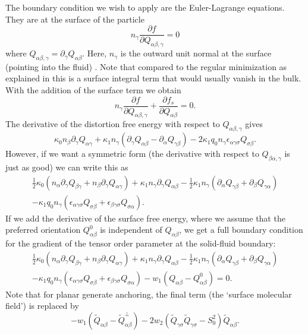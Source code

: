 The boundary condition we wish to apply are the Euler-Lagrange equations. 
They are at the surface of the particle
\begin{equation}
n_\gamma \frac{\partial f}{\partial Q_{\alpha\beta,\gamma}} = 0
\end{equation}
where $Q_{\alpha\beta,\gamma} = \partial_\gamma Q_{\alpha\beta}$. Here,
$n_\gamma$ is the outward unit normal at the surface (pointing into the
fluid) \cite{skarabot}. Note that compared to the regular minimization as  
explained in \cite{wright} this is a surface integral term that would 
usually vanish in the bulk.
With the
addition of the surface term we obtain
\begin{equation}
n_\gamma \frac{\partial f}{\partial Q_{\alpha\beta,\gamma}}
+ \frac{\partial f_s}{\partial Q_{\alpha\beta}} = 0.
\end{equation}
The derivative of the distortion free energy with respect to
$Q_{\alpha\beta,\gamma}$ gives
\begin{equation}
\kappa_0 n_\beta \partial_\gamma Q_{\alpha\gamma}
+ \kappa_1 n_\gamma
(\partial_\gamma Q_{\alpha\beta} - \partial_\alpha Q_{\gamma\beta})
- 2\kappa_1 q_0 n_\gamma \epsilon_{\alpha\gamma\sigma} Q_{\sigma\beta}.
\end{equation}
However, if we want a symmetric form (the derivative with respect to
$Q_{\beta\alpha,\gamma}$ is just as good) we can write this as
\begin{eqnarray}
{\textstyle\frac{1}{2}} \kappa_0 (n_\alpha \partial_\gamma Q_{\beta\gamma}
+ n_\beta \partial_\gamma Q_{\alpha\gamma})
+ \kappa_1 n_\gamma \partial_\gamma Q_{\alpha\beta}
- {\textstyle\frac{1}{2}} \kappa_1 n_\gamma ( \partial_\alpha Q_{\gamma\beta}
+ \partial_\beta Q_{\gamma\alpha})
\nonumber
\\
- \kappa_1 q_0 n_\gamma (\epsilon_{\alpha\gamma\sigma} Q_{\sigma\beta}
+ \epsilon_{\beta\gamma\sigma}Q_{\sigma\alpha}).
\end{eqnarray}
If we add the derivative of the surface free energy,
where we assume that the preferred orientation $Q_{\alpha\beta}^0$ is
independent of $Q_{\alpha\beta}$, we get a full boundary condition
for the gradient of the tensor order parameter at the solid-fluid boundary:
\begin{eqnarray}
{\textstyle\frac{1}{2}} \kappa_0 (n_\alpha \partial_\gamma Q_{\beta\gamma}
+ n_\beta \partial_\gamma Q_{\alpha\gamma})
+ \kappa_1 n_\gamma \partial_\gamma Q_{\alpha\beta}
- {\textstyle\frac{1}{2}} \kappa_1 n_\gamma ( \partial_\alpha Q_{\gamma\beta}
+ \partial_\beta Q_{\gamma\alpha})
\nonumber
\\
- \kappa_1 q_0 n_\gamma (\epsilon_{\alpha\gamma\sigma} Q_{\sigma\beta}
+ \epsilon_{\beta\gamma\sigma}Q_{\sigma\alpha})
- w_1(Q_{\alpha\beta} - Q_{\alpha\beta}^0) = 0.
\label{cholesteric_bc}
\end{eqnarray}
Note that for planar generate anchoring, the final term (the `surface
molecular field') is replaced by
\begin{equation}
- w_1 (\tilde{Q}_{\alpha\beta} - \tilde{Q}^\perp_{\alpha\beta})
- 2w_2 (\tilde{Q}_{\gamma\sigma} \tilde{Q}_{\gamma\sigma} - S^2_0)
  \tilde{Q}_{\alpha\beta}. 
\end{equation}

